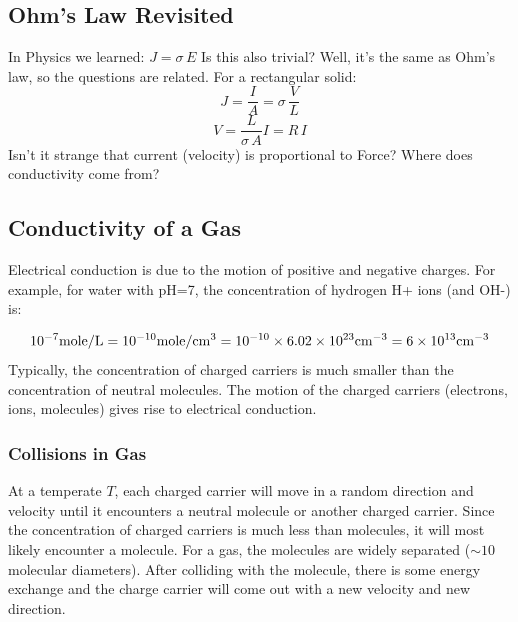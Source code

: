 \subsection{Ohm’s Law Revisited}
  
In Physics we learned:  $J = \sigma \,E$  Is this also trivial? Well, it’s the same as Ohm’s law, so the questions are related. For a rectangular solid:
\begin{equation}
	J = \frac{I}{A} = \sigma \,\frac{V}{L} \end{equation}\begin{equation}  V = \frac{L}{{\sigma \,A}}I = R\,I
\end{equation}
Isn’t it strange that current (velocity) is proportional to Force?  Where does conductivity come from?

 
\subsection{Conductivity of a Gas}

 Electrical conduction is due to the motion of positive and negative charges.   For example, for  water with pH=7, the concentration of hydrogen H+ ions (and OH-) is:

\begin{equation}
{10^{ - 7}}{\rm{mole/L}} = {\rm{1}}{{\rm{0}}^{{\rm{ - 10}}}}{\rm{mole/c}}{{\rm{m}}^{\rm{3}}} 
= {\rm{1}}{{\rm{0}}^{{\rm{ - 10}}}} \times 6.02 \times {10^{23}}{\rm{c}}{{\rm{m}}^{ - 3}} 
= 6 \times {10^{13}}{\rm{c}}{{\rm{m}}^{ - 3}}
\end{equation}
Typically, the concentration of charged carriers is much smaller than the concentration of neutral molecules.   The motion of the charged carriers (electrons, ions, molecules) gives rise to electrical conduction.
 

\subsubsection{Collisions in Gas}

At a temperate $T$, each charged carrier will move in a random direction and velocity until it encounters a neutral molecule or another charged carrier.  Since the concentration of charged carriers is much less than molecules, it will most likely encounter a molecule. For a gas, the molecules are widely separated ($\sim 10$ molecular diameters).  After colliding with the molecule, there is some energy exchange and the charge carrier will come out with a new velocity and new direction.
 
